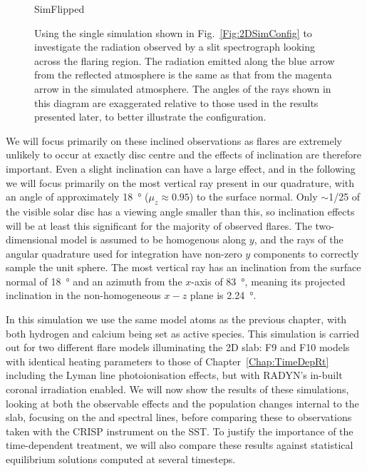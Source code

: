 \begin{figure}[tbp]
\centering
{SimFlipped}
\caption[Configuration of two-dimensional simulation to produce radiation that would be observed by a slit spectrograph looking across the model flare.]{Using the single simulation shown in Fig.~\ref{Fig:2DSimConfig} to investigate the radiation observed by a slit spectrograph looking across the flaring region. The radiation emitted along the {\color{TolBlue}blue} arrow from the reflected atmosphere is the same as that from the {\color{TolMagenta}magenta} arrow in the simulated atmosphere. The angles of the rays shown in this diagram are exaggerated relative to those used in the results presented later, to better illustrate the configuration.}
\label{Fig:2DSimFlipped}
\end{figure}

We will focus primarily on these inclined observations as flares are extremely unlikely to occur at exactly disc centre and the effects of inclination are therefore important.
Even a slight inclination can have a large effect, and in the following we will focus primarily on the most vertical ray present in our quadrature, with an angle of approximately \SI{18}{\degree} ($\mu_z\approx0.95$) to the surface normal.
Only $\sim$1/25 of the visible solar disc has a viewing angle smaller than this, so inclination effects will be at least this significant for the majority of observed flares.
The two-dimensional model is assumed to be homogenous along $y$, and the rays of the angular quadrature used for integration have non-zero $y$ components to correctly sample the unit sphere.
The most vertical ray has an inclination from the surface normal of \SI{18}{\degree} and an azimuth from the $x$-axis of \SI{83}{\degree}, meaning its projected inclination in the non-homogeneous $x-z$ plane is \SI{2.24}{\degree}.

In this simulation we use the same model atoms as the previous chapter, with both hydrogen and calcium being set as active species.
This simulation is carried out for two different flare models illuminating the 2D slab: F9 and F10 models with identical heating parameters to those of Chapter~\ref{Chap:TimeDepRt} including the Lyman line photoionisation effects, but with RADYN's in-built coronal irradiation enabled.
We will now show the results of these simulations, looking at both the observable effects and the population changes internal to the slab, focusing on the \Ha{} and \CaLine{} spectral lines, before comparing these to observations taken with the CRISP instrument on the SST.
To justify the importance of the time-dependent treatment, we will also compare these results against statistical equilibrium solutions computed at several timesteps.



